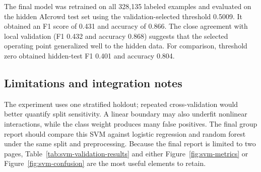 The final model was retrained on all 328,135 labeled examples and evaluated on
the hidden AIcrowd test set using the validation-selected threshold 0.5009. It
obtained an F1 score of 0.431 and accuracy of 0.866. The close agreement with
local validation (F1 0.432 and accuracy 0.868) suggests that the selected
operating point generalized well to the hidden data. For comparison, threshold
zero obtained hidden-test F1 0.401 and accuracy 0.804.

\subsection{Limitations and integration notes}

The experiment uses one stratified holdout; repeated cross-validation would
better quantify split sensitivity. A linear boundary may also underfit
nonlinear interactions, while the class weight produces many false positives.
The final group report should compare this SVM against logistic regression and
random forest under the same split and preprocessing. Because the final report
is limited to two pages, Table~\ref{tab:svm-validation-results} and either
Figure~\ref{fig:svm-metrics} or Figure~\ref{fig:svm-confusion} are the most
useful elements to retain.

